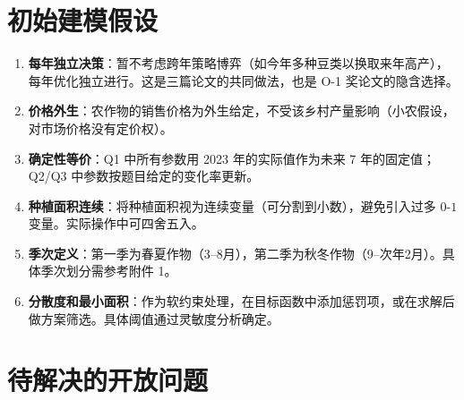 \documentclass{internal-report}
\begin{document}
\section{初始建模假设}

\begin{enumerate}
    \item \textbf{每年独立决策}：暂不考虑跨年策略博弈（如今年多种豆类以换取来年高产），每年优化独立进行。这是三篇论文的共同做法，也是 O-1 奖论文的隐含选择。
    
    \item \textbf{价格外生}：农作物的销售价格为外生给定，不受该乡村产量影响（小农假设，对市场价格没有定价权）。
    
    \item \textbf{确定性等价}：Q1 中所有参数用 2023 年的实际值作为未来 7 年的固定值；Q2/Q3 中参数按题目给定的变化率更新。
    
    \item \textbf{种植面积连续}：将种植面积视为连续变量（可分割到小数），避免引入过多 $0$-$1$ 变量。实际操作中可四舍五入。
    
    \item \textbf{季次定义}：第一季为春夏作物（3--8月），第二季为秋冬作物（9--次年2月）。具体季次划分需参考附件 1。
    
    \item \textbf{分散度和最小面积}：作为软约束处理，在目标函数中添加惩罚项，或在求解后做方案筛选。具体阈值通过灵敏度分析确定。
\end{enumerate}

\section{待解决的开放问题}
\end{document}
